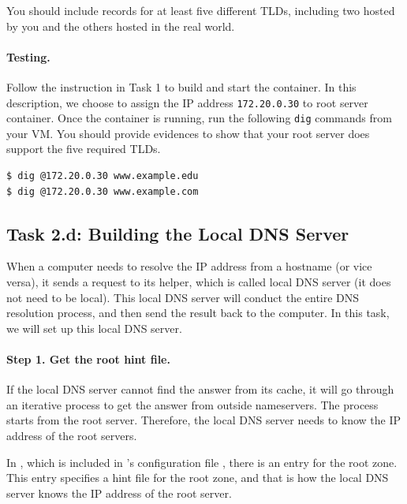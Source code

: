 You should include records for at least five different TLDs, including two
hosted by you and the others hosted in the real world. 



\paragraph{Testing.} 
Follow the instruction in Task 1 to build and start the container. 
In this description, we choose to assign the 
IP address \texttt{172.20.0.30} to root server container.
Once the container is running,
run the following \texttt{dig} commands from your VM.
You should provide evidences to show that your root server does support the 
five required TLDs.

\begin{lstlisting}
$ dig @172.20.0.30 www.example.edu
$ dig @172.20.0.30 www.example.com
\end{lstlisting}


\subsection{Task 2.d: Building the Local DNS Server} 

When a computer needs to resolve the IP address from a hostname (or vice versa),
it sends a request to its helper, which is called local DNS server (it
does not need to be local).  This local DNS server will conduct the 
entire DNS resolution process, and then send the result back to the computer. 
In this task, we will set up this local DNS server. 


\paragraph{Step 1. Get the root hint file.}

If the local DNS server cannot find the answer from its cache, it 
will go through an iterative process to get the answer from outside 
nameservers.  The process starts from the root server. 
Therefore, the local DNS server needs to
know the IP address of the root servers. 


In , which is included 
in \bind's configuration file , there is an 
entry for the root zone. This entry specifies a hint file for the
root zone, and that is how the local DNS server knows the IP address of the
root server. 


